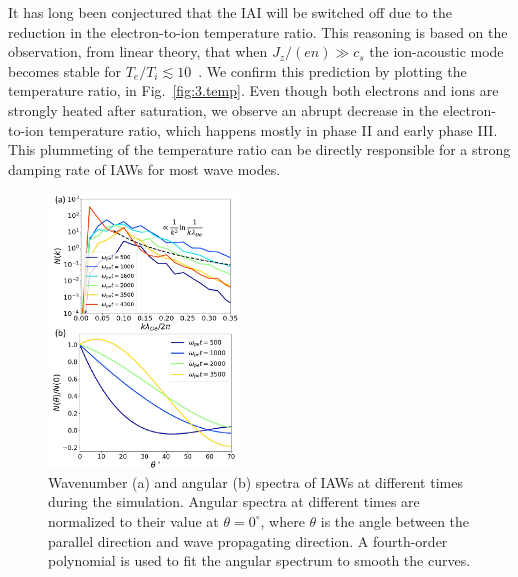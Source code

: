 \documentclass[%
 reprint,
 amsmath,
 amssymb,
 aps,
 prx,
floatfix,
superscriptaddress
]{revtex4-2}
\begin{document}
It has long been conjectured that the IAI will be switched off due to the reduction in the electron-to-ion temperature ratio.
This reasoning is based on the observation, from linear theory, that when $J_z/(e n)\gg c_s$ the ion-acoustic mode becomes stable for $T_e/T_i\lesssim 10$~\cite{papadopoulos1977review,benz2012plasma}.
We confirm this prediction by plotting the temperature ratio, in Fig.~\ref{fig:3.temp}. 
Even though both electrons and ions are strongly heated after saturation, we observe an abrupt decrease in the electron-to-ion temperature ratio, which happens mostly in phase II and early phase III.
This plummeting of the temperature ratio can be directly responsible for a strong damping rate of IAWs for most wave modes.
\begin{figure}[!htbp]
\includegraphics[width=0.45\textwidth]{Fig4.pdf}%
\caption{\label{fig:4.spectrum} Wavenumber (a) and angular (b) spectra of IAWs at different times during the simulation. Angular spectra at different times are normalized to their value at $\theta = 0^{\circ}$, where $\theta$ is the angle between the parallel direction and wave propagating direction. A fourth-order polynomial is used to fit the angular spectrum to smooth the curves.}
\end{figure}
\end{document}
